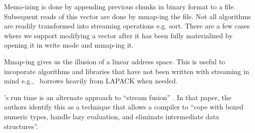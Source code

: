 Memo-izing is done by appending previous chunks in binary format to a file.
Subsequent reads of this vector are done by mmap-ing the file. Not all
algorithms are readily transformed into streaming operations e.g. sort. There
are a few cases where we support modifying a vector after it has been fully
materialized by opening it in write mode and mmap-ing it.

Mmap-ing gives us the illusion of a linear address space. This is useful to
incoporate algorithms and libraries that have not been written with streaming in
mind e.g., \Q\ borrows heavily from LAPACK when needed.

\Q's run time is an alternate approach to ``stream fusion''
\cite{Mainland2017}. In
that paper, the authors identify this as a technique that allows a compiler to
``cope with boxed numeric types, handle lazy evaluation, and
eliminate intermediate data structures''.
